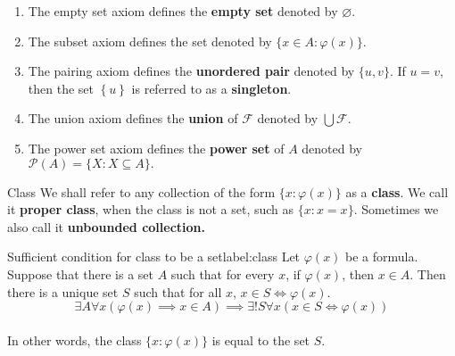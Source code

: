 \begin{remarks}
    \begin{enumerate}
        \item The empty set axiom defines the \textbf{empty set} denoted
            by $\varnothing$.
        \item The subset axiom defines the set denoted by $\{x \in
            A:\varphi(x)\}$.
        \item The pairing axiom defines the \textbf{unordered pair}
            denoted by $\{u, v\}$. If $u = v$, then the set
            $\left\{u\right\}$ is referred to as a \textbf{singleton}.
        \item The union axiom defines the \textbf{union} of $\mathcal{F}$
            denoted by $\bigcup \mathcal{F}$.
        \item The power set axiom defines the \textbf{power set} of $A$
            denoted by $\mathcal{P}(A) = \{X:X \subseteq A\}.$
    \end{enumerate}
\end{remarks}

\begin{definition}{Class}{}
    We shall refer to any collection of the form $\{x:\varphi(x)\}$ as
    a \textbf{class}. We call it \textbf{proper class},
    when the class is not a set, such as $\{x:x=x\}$. Sometimes we also
    call it \textbf{unbounded collection.}
\end{definition}

\begin{theorem}{Sufficient condition for class to be a set}{label:class}
    Let $\varphi(x)$ be a formula. Suppose that there is a set $A$ such
    that for every $x$, if $\varphi(x)$, then $x \in A$. Then there is
    a unique set $S$ such that for all $x$, $x \in S \iff \varphi(x)$.\\
    \begin{equation*}
        \exists A \forall x (\varphi(x) \implies x \in A) \implies
        \exists ! S \forall x(x \in S \iff \varphi(x))
    \end{equation*}
    \\
    In other words, the class $\{x:\varphi(x)\}$ is equal to the set $S$.
\end{theorem}

